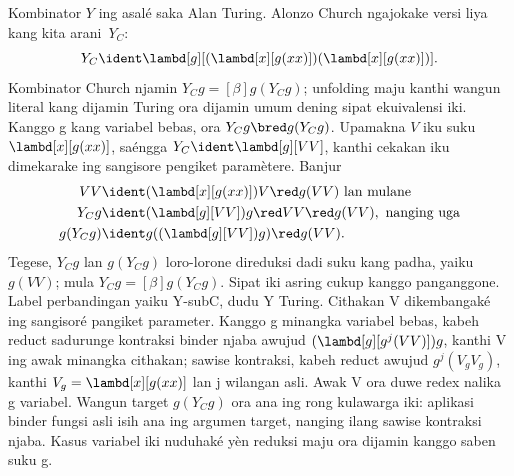 \documentclass[../../../include/open-logic-section]{subfiles}
\begin{document}
Kombinator $Y$ ing  asalé saka Alan
Turing. Alonzo Church ngajokake versi liya kang kita
arani~$Y_C$:
\[
Y_C \ident \lambd[g][(\lambd[x][g(xx)])(\lambd[x][g(xx)])].
\]
Kombinator Church njamin $Y_Cg \equal[\beta] g(Y_Cg)$; unfolding maju kanthi wangun literal kang dijamin Turing ora dijamin umum dening sipat ekuivalensi iki. Kanggo g kang variabel bebas, ora $Y_Cg \bred g(Y_Cg)$.
Upamakna $V$ iku suku $\lambd[x][g(xx)]$, saéngga
$Y_C \ident \lambd[g][VV]$, kanthi cekakan iku dimekarake
ing sangisore pengiket paramètere. Banjur
\begin{align*}
  VV & \ident (\lambd[x][g(xx)])V \red g(VV)
  \text{ lan mulane}\\
  Y_C g & \ident (\lambd[g][VV])g \red VV \red g(VV), \text{ nanging uga}\\
  g(Y_C g) & \ident g((\lambd[g][VV])g) \red g(VV).
\end{align*}
Tegese, $Y_Cg$ lan $g(Y_Cg)$ loro-lorone direduksi dadi
suku kang padha, yaiku $g(VV)$; mula $Y_Cg \equal[\beta] g(Y_Cg)$.
Sipat iki asring cukup kanggo panganggone. Label perbandingan yaiku Y-subC, dudu Y Turing. Cithakan V dikembangaké ing sangisoré pangiket parameter. Kanggo g minangka variabel bebas, kabeh reduct sadurunge kontraksi binder njaba awujud $(\lambd[g][g^j(VV)])g$, kanthi V ing awak minangka cithakan; sawise kontraksi, kabeh reduct awujud $g^j(V_gV_g)$, kanthi $V_g=\lambd[x][g(xx)]$ lan j wilangan asli. Awak V ora duwe redex nalika g variabel. Wangun target $g(Y_Cg)$ ora ana ing rong kulawarga iki: aplikasi binder fungsi asli isih ana ing argumen target, nanging ilang sawise kontraksi njaba. Kasus variabel iki nuduhaké yèn reduksi maju ora dijamin kanggo saben suku g.
\end{document}
